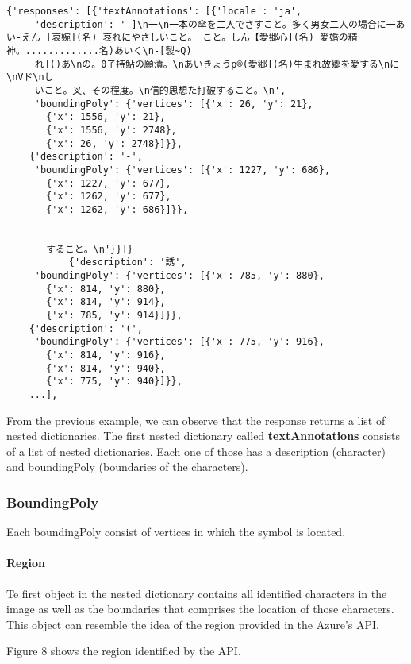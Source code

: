 \documentclass[
]{article}
\begin{document}
\begin{verbatim}
{'responses': [{'textAnnotations': [{'locale': 'ja',
     'description': '-]\n一\n一本の傘を二人でさすこと。多く男女二人の場合に一あい-えん [哀婉](名) 哀れにやさしいこと。 こと。しん【愛郷心](名) 愛婚の精神。.............名)あいく\n-[製~Q)
     れ]()あ\nの。0子持鮎の願漬。\nあいきょうp®(愛郷](名)生まれ故郷を愛する\nに\nVド\nし
     いこと。叉、その程度。\n信的思想た打破すること。\n',
     'boundingPoly': {'vertices': [{'x': 26, 'y': 21},
       {'x': 1556, 'y': 21},
       {'x': 1556, 'y': 2748},
       {'x': 26, 'y': 2748}]}},
    {'description': '-',
     'boundingPoly': {'vertices': [{'x': 1227, 'y': 686},
       {'x': 1227, 'y': 677},
       {'x': 1262, 'y': 677},
       {'x': 1262, 'y': 686}]}},
       
       
       すること。\n'}}]}
           {'description': '誘',
     'boundingPoly': {'vertices': [{'x': 785, 'y': 880},
       {'x': 814, 'y': 880},
       {'x': 814, 'y': 914},
       {'x': 785, 'y': 914}]}},
    {'description': '(',
     'boundingPoly': {'vertices': [{'x': 775, 'y': 916},
       {'x': 814, 'y': 916},
       {'x': 814, 'y': 940},
       {'x': 775, 'y': 940}]}},
    ...],
\end{verbatim}

From the previous example, we can observe that the response returns a
list of nested dictionaries. The first nested dictionary called
\textbf{textAnnotations} consists of a list of nested dictionaries. Each
one of those has a description (character) and boundingPoly (boundaries
of the characters).

\hypertarget{boundingpoly}{%
\subsubsection{BoundingPoly}\label{boundingpoly}}

Each boundingPoly consist of vertices in which the symbol is located.

\hypertarget{region}{%
\paragraph{Region}\label{region}}

Te first object in the nested dictionary contains all identified
characters in the image as well as the boundaries that comprises the
location of those characters. This object can resemble the idea of the
region provided in the Azure's API.

Figure 8 shows the region identified by the API.
\end{document}
